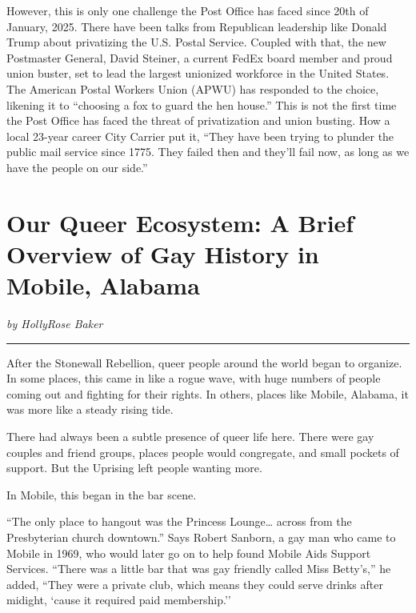 \documentclass[
]{book}
\begin{document}
However, this is only one challenge the Post Office has faced since 20th of January, 2025. There have been talks from Republican leadership like Donald Trump about privatizing the U.S. Postal Service. Coupled with that, the new Postmaster General, David Steiner, a current FedEx board member and proud union buster, set to lead the largest unionized workforce in the United States. The American Postal Workers Union (APWU) has responded to the choice, likening it to ``choosing a fox to guard the hen house.'' This is not the first time the Post Office has faced the threat of privatization and union busting. How a local 23-year career City Carrier put it, ``They have been trying to plunder the public mail service since 1775. They failed then and they'll fail now, as long as we have the people on our side.''

\section*{Our Queer Ecosystem: A Brief Overview of Gay History in Mobile, Alabama}\label{our-queer-ecosystem-a-brief-overview-of-gay-history-in-mobile-alabama}

\emph{by HollyRose Baker}

\begin{center}\rule{0.5\linewidth}{0.5pt}\end{center}

After the Stonewall Rebellion, queer people around the world began to organize. In some places, this came in like a rogue wave, with huge numbers of people coming out and fighting for their rights. In others, places like Mobile, Alabama, it was more like a steady rising tide.

There had always been a subtle presence of queer life here. There were gay couples and friend groups, places people would congregate, and small pockets of support. But the Uprising left people wanting more.

In Mobile, this began in the bar scene.

``The only place to hangout was the Princess Lounge\ldots{} across from the Presbyterian church downtown.'' Says Robert Sanborn, a gay man who came to Mobile in 1969, who would later go on to help found Mobile Aids Support Services. ``There was a little bar that was gay friendly called Miss Betty's,'' he added, ``They were a private club, which means they could serve drinks after midight, `cause it required paid membership.''
\end{document}
